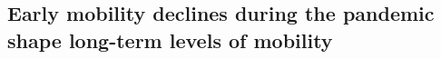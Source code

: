 \documentclass[fleqn,10pt]{wlscirep}
\providecommand{\DIFdelbegin}{} %
\providecommand{\DIFdelend}{} %
\begin{document}
\DIFdelbegin %


\DIFdelend \subsection*{Early mobility declines during the pandemic shape long-term levels of mobility}
\end{document}

